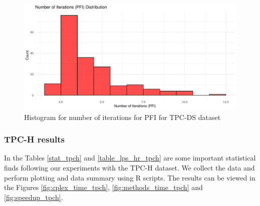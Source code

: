 \begin{figure}[!htb]
    \centering
    \includegraphics[width=\linewidth]{figures/num_iter_pfi_tpcds.pdf}
    \caption{Histogram for number of iterations for PFI for TPC-DS dataset}
    \label{fig:num_iter_pfi_tpcds}
\end{figure}


\subsubsection{TPC-H results}
In the Tables \ref{stat_tpch} and \ref{table_lps_hr_tpch} are some important statistical finds following our
experiments with the TPC-H dataset.
We collect the data and perform plotting and data summary using R scripts. The results can be
viewed in the Figures \ref{fig:cplex_time_tpch}, \ref{fig:methods_time_tpch} and \ref{fig:speedup_tpch}.

